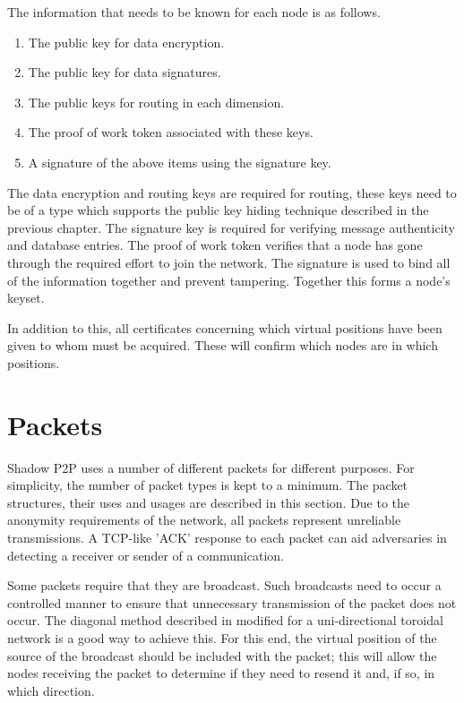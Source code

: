 \documentclass[ %
                    author={Luke Murray},
                supervisor={Dr. Simon Hollis},
                     title={Shadow Peer-to-Peer Networks},
                  subtitle={},
                    degree={MEng},
                      year={2013} ]{thesis}
\begin{document}
The information that needs to be known for each node is as follows.
\begin{enumerate}
\item The public key for data encryption.
\item The public key for data signatures.
\item The public keys for routing in each dimension.
\item The proof of work token associated with these keys.
\item A signature of the above items using the signature key.
\end{enumerate}
The data encryption and routing keys are required for routing, these keys need to be of a type which supports the public key hiding technique described in the previous chapter. The signature key is required for verifying message authenticity and database entries. The proof of work token verifies that a node has gone through the required effort to join the network. The signature is used to bind all of the information together and prevent tampering. Together this forms a node's keyset.

In addition to this, all certificates concerning which virtual positions have been given to whom must be acquired. These will confirm which nodes are in which positions.

\section{Packets}

Shadow P2P uses a number of different packets for different purposes. For simplicity, the number of packet types is kept to a minimum. The packet structures, their uses and usages are described in this section. Due to the anonymity requirements of the network, all packets represent unreliable transmissions. A TCP-like 'ACK' response to each packet can aid adversaries in detecting a receiver or sender of a communication.

Some packets require that they are broadcast. Such broadcasts need to occur a controlled manner to ensure that unnecessary transmission of the packet does not occur. The diagonal method described in \cite{218454} modified for a uni-directional toroidal network is a good way to achieve this. For this end, the virtual position of the source of the broadcast should be included with the packet; this will allow the nodes receiving the packet to determine if they need to resend it and, if so, in which direction.
\end{document}
